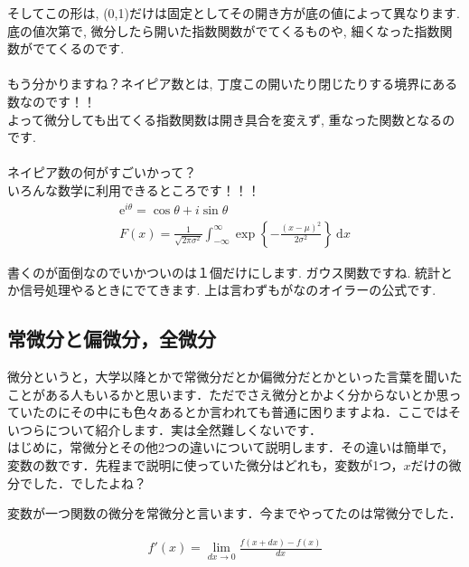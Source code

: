 \documentclass[11pt,a4paper]{ujreport}
\begin{document}
そしてこの形は, (0,1)だけは固定としてその開き方が底の値によって異なります. \\

底の値次第で, 微分したら開いた指数関数がでてくるものや, 細くなった指数関数がでてくるのです.\\
\\

もう分かりますね？ネイピア数とは, 丁度この開いたり閉じたりする境界にある数なのです！！\\

よって微分しても出てくる指数関数は開き具合を変えず, 重なった関数となるのです.\\
\\

ネイピア数の何がすごいかって？\\

いろんな数学に利用できるところです！！！\\
\begin{eqnarray}
\mathrm{e}^{i\theta} = \cos\theta + i\sin\theta \\
F(x)=\frac{1}{\sqrt{2\pi \sigma^2}}\int_{-\infty}^{\infty}\exp{\left\{-\frac{(x-\mu)^2}{2\sigma^2}\right\}}\ \mathrm{d}x
\end{eqnarray}

書くのが面倒なのでいかついのは１個だけにします. ガウス関数ですね. 統計とか信号処理やるときにでてきます. 上は言わずもがなのオイラーの公式です.\\

\subsection{常微分と偏微分，全微分}
微分というと，大学以降とかで常微分だとか偏微分だとかといった言葉を聞いたことがある人もいるかと思います．ただでさえ微分とかよく分からないとか思っていたのにその中にも色々あるとか言われても普通に困りますよね．ここではそいつらについて紹介します．実は全然難しくないです．\\

はじめに，常微分とその他2つの違いについて説明します．その違いは簡単で，変数の数です．先程まで説明に使っていた微分はどれも，変数が1つ，$x$だけの微分でした．でしたよね？

変数が一つ関数の微分を常微分と言います．今までやってたのは常微分でした．

\begin{eqnarray}
f'(x) =\lim_{dx \rightarrow 0} \frac{f(x+dx) - f(x)}{dx}
\end{eqnarray}
\end{document}
